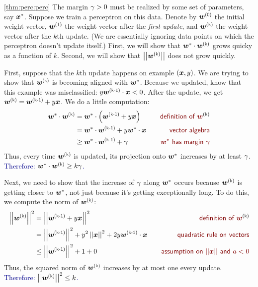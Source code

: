 \documentclass[trans]{beamer}
\begin{document}
\begin{myproof}{\ref{thm:perc:perc}}
  The margin $\gamma > 0$ must be realized by some set of parameters, say
  ${\boldsymbol{x}}^*$.  Suppose we train a perceptron on this data.  Denote by
  $\vw\zth$ the initial weight vector, $\vw\oth$ the weight vector
  after the \emph{first update}, and $\vw\kth$ the weight vector after
  the $k$th update.  (We are essentially ignoring data points on which
  the perceptron doesn't update itself.)  First, we will show that
  $\dotp{\vw^*}{\vw\kth}$ grows quicky as a function of $k$.  Second,
  we will show that $\norm{\vw\kth}$ does not grow quickly.

  First, suppose that the $k$th update happens on example $({\boldsymbol{x}},y)$.
  We are trying to show that $\vw\kth$ is becoming aligned with
  ${\boldsymbol{w}}^*$.  Because we updated, know that this example was
  misclassified: $y \dotp{\vw\kpth}{\vx} < 0$.  After the update, we get
  $\vw\kth = \vw\kpth + y \vx$.  We do a little computation:
  \begin{align}
    \dotp{\vw^*}{\vw\kth}
    &= \dotp{\vw^*}{\left(\vw\kpth + y \vx\right)} 
         \becauseof{definition of $\vw\kth$}
    \\
    &= \dotp{\vw^*}{\vw\kpth} + y \dotp{\vw^*}{\vx}
         \becauseof{vector algebra}
    \\
    &\geq \dotp{\vw^*}{\vw\kpth} + \ga
         \becauseof{$\vw^*$ has margin $\ga$}
  \end{align}
  Thus, every time $\vw\kth$ is updated, its projection onto ${\boldsymbol{w}}^*$
  increases by at least $\gamma$.  \textcolor{darkblue}{Therefore:
    $\dotp{\vw^*}{\vw\kth} \geq k \ga$.}

  Next, we need to show that the increase of $\gamma$ along ${\boldsymbol{w}}^*$
  occurs because $\vw\kth$ is getting closer to ${\boldsymbol{w}}^*$, not just
  because it's getting exceptionally long.  To do this, we compute the
  norm of $\vw\kth$:
  \begin{align}
    \norm{\vw\kth}^2
    &= \norm{\vw\kpth + y \vx}^2
         \becauseof{definition of $\vw\kth$} \\
    &= \norm{\vw\kpth}^2 + y^2 \norm{\vx}^2 + 2 y \dotp{\vw\kpth}{\vx}
         \becauseof{quadratic rule on vectors} \\
    &\leq \norm{\vw\kpth}^2 + 1 + 0
         \becauseof{assumption on $\norm{\vx}$ and $a < 0$}
  \end{align}
  Thus, the squared norm of $\vw\kth$ increases by at most one every
  update.  \textcolor{darkblue}{Therefore: $\norm{\vw\kth}^2 \leq k$.}


\end{myproof}
\end{document}
